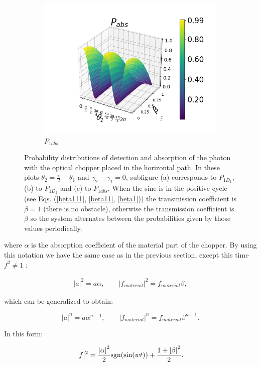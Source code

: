 \documentclass[12pt]{book}
\begin{document}
\begin{figure}[t!]
\begin{subfigure}[b]{0.4\linewidth}
\includegraphics[width=\linewidth]{images/PAbs_h.png}
\caption{$P_{1abs}$}
\label{fig:BS1}
\end{subfigure}
\caption{Probability distributions of detection and absorption of the photon with the optical chopper placed in the horizontal path. In these plots $\theta_{2}=\frac{\pi}{2}-\theta_{1}$ and $\gamma_{2}-\gamma_{1}=0$, subfigure (a) corresponds to $P_{1D_{1}}$, (b) to $P_{1D_{2}}$ and (c) to $P_{1abs}$. When the sine is in the positive cycle (see Eqs. (\ref{beta111}, \ref{beta11}, \ref{beta1}))  the transmission coefficient is $\beta=1$ (there is no obstacle), otherwise  the transmission coefficient is $\beta$  so the system alternates between the probabilities given by those values periodically.}
\label{P3chopper}
\end{figure}

where $\alpha$ is the absorption coefficient of the material part of the chopper. By using this notation we have the same case as in the previous section, except this time $f^2 \neq 1$ :

\begin{align}
|a|^2=a \alpha,\qquad |f_{material}|^2=f_{material} \beta,
\end{align}

which can be generalized to obtain:

\begin{equation}
|a|^n=a\alpha^{n-1},\qquad|f_{material}|^n=f_{material} \beta^{n-1}.
\end{equation}

In this form:

\begin{equation}
|f|^2=  \frac{\abs{\alpha}^2}{2} \mathrm{sgn}(\sin(wt)) +\frac{1+\abs{\beta}^2}{2}.
\end{equation}
\end{document}
